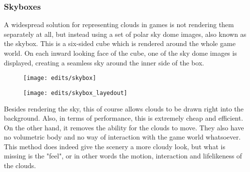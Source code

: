 \subsubsection{Skyboxes}
A widespread solution for representing clouds in games is not rendering them separately at all, but instead using a set of polar sky dome images, also known as the skybox. This is a six-sided cube which is rendered around the whole game world. On each inward looking face of the cube, one of the sky dome images is displayed, creating a seamless sky around the inner side of the box.
\begin{figure}[H]
    \centering
        \begin{minipage}{0.47\linewidth}
            \texttt{[image: edits/skybox]}
            \label{img:edits:skybox}
        \end{minipage}
    \hfill
        \begin{minipage}{0.45\linewidth}
            \texttt{[image: edits/skybox\_layedout]}
            \label{img:edits:skybox_layedout}
        \end{minipage}
\end{figure}

\noindent
Besides rendering the sky, this of course allows clouds to be drawn right into the background. Also, in terms of performance, this is extremely cheap and efficient. On the other hand, it removes the ability for the clouds to move. 
They also have no volumetric body and no way of interaction with the game world whatsoever.
\\
This method does indeed give the scenery a more cloudy look, but what is missing is the "feel", or in other words the motion, interaction and lifelikeness of the clouds.

